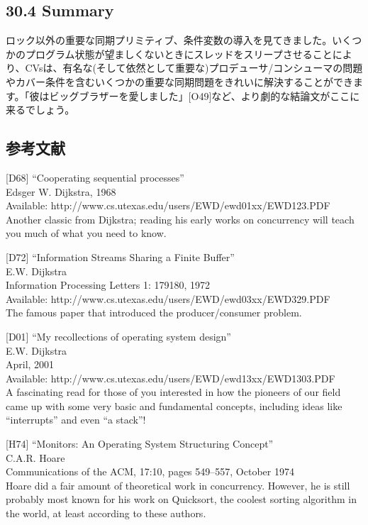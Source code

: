 \hypertarget{summary-19}{%
\subsection*{30.4 Summary}\label{summary-19}}

ロック以外の重要な同期プリミティブ、条件変数の導入を見てきました。いくつかのプログラム状態が望ましくないときにスレッドをスリープさせることにより、CVsは、有名な(そして依然として重要な)プロデューサ/コンシューマの問題やカバー条件を含むいくつかの重要な同期問題をきれいに解決することができます。「彼はビッグブラザーを愛しました」{[}O49{]}など、より劇的な結論文がここに来るでしょう。

\hypertarget{ux53c2ux8003ux6587ux732e-19}{%
\subsection*{参考文献}\label{ux53c2ux8003ux6587ux732e-19}}

{[}D68{]} ``Cooperating sequential processes''\\
Edsger W. Dijkstra, 1968\\
Available: http://www.cs.utexas.edu/users/EWD/ewd01xx/EWD123.PDF\\
Another classic from Dijkstra; reading his early works on concurrency
will teach you much of what you need to know.

{[}D72{]} ``Information Streams Sharing a Finite Buffer''\\
E.W. Dijkstra\\
Information Processing Letters 1: 179180, 1972\\
Available: http://www.cs.utexas.edu/users/EWD/ewd03xx/EWD329.PDF\\
The famous paper that introduced the producer/consumer problem.

{[}D01{]} ``My recollections of operating system design''\\
E.W. Dijkstra\\
April, 2001\\
Available: http://www.cs.utexas.edu/users/EWD/ewd13xx/EWD1303.PDF\\
A fascinating read for those of you interested in how the pioneers of
our field came up with some very basic and fundamental concepts,
including ideas like ``interrupts'' and even ``a stack''!

{[}H74{]} ``Monitors: An Operating System Structuring Concept''\\
C.A.R. Hoare\\
Communications of the ACM, 17:10, pages 549--557, October 1974\\
Hoare did a fair amount of theoretical work in concurrency. However, he
is still probably most known for his work on Quicksort, the coolest
sorting algorithm in the world, at least according to these authors.

